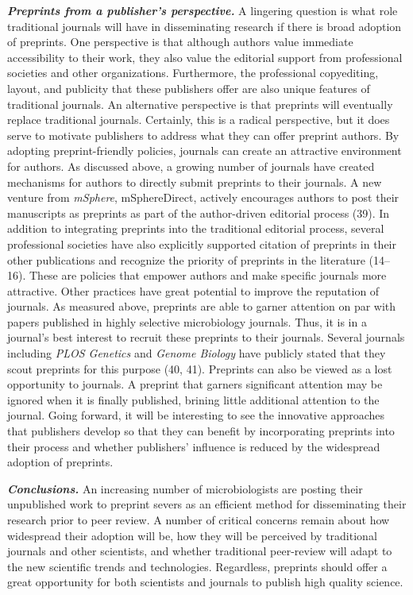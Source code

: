 \documentclass[11pt,]{article}
\begin{document}
\textbf{\emph{Preprints from a publisher's perspective.}} A lingering
question is what role traditional journals will have in disseminating
research if there is broad adoption of preprints. One perspective is
that although authors value immediate accessibility to their work, they
also value the editorial support from professional societies and other
organizations. Furthermore, the professional copyediting, layout, and
publicity that these publishers offer are also unique features of
traditional journals. An alternative perspective is that preprints will
eventually replace traditional journals. Certainly, this is a radical
perspective, but it does serve to motivate publishers to address what
they can offer preprint authors. By adopting preprint-friendly policies,
journals can create an attractive environment for authors. As discussed
above, a growing number of journals have created mechanisms for authors
to directly submit preprints to their journals. A new venture from
\emph{mSphere}, mSphereDirect, actively encourages authors to post their
manuscripts as preprints as part of the author-driven editorial process
(39). In addition to integrating preprints into the traditional
editorial process, several professional societies have also explicitly
supported citation of preprints in their other publications and
recognize the priority of preprints in the literature (14--16). These
are policies that empower authors and make specific journals more
attractive. Other practices have great potential to improve the
reputation of journals. As measured above, preprints are able to garner
attention on par with papers published in highly selective microbiology
journals. Thus, it is in a journal's best interest to recruit these
preprints to their journals. Several journals including \emph{PLOS
Genetics} and \emph{Genome Biology} have publicly stated that they scout
preprints for this purpose (40, 41). Preprints can also be viewed as a
lost opportunity to journals. A preprint that garners significant
attention may be ignored when it is finally published, brining little
additional attention to the journal. Going forward, it will be
interesting to see the innovative approaches that publishers develop so
that they can benefit by incorporating preprints into their process and
whether publishers' influence is reduced by the widespread adoption of
preprints.

\textbf{\emph{Conclusions.}} An increasing number of microbiologists are
posting their unpublished work to preprint severs as an efficient method
for disseminating their research prior to peer review. A number of
critical concerns remain about how widespread their adoption will be,
how they will be perceived by traditional journals and other scientists,
and whether traditional peer-review will adapt to the new scientific
trends and technologies. Regardless, preprints should offer a great
opportunity for both scientists and journals to publish high quality
science.
\end{document}
